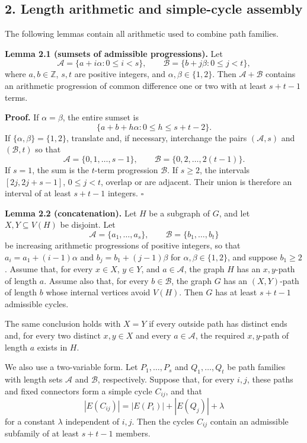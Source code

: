 \documentclass[
  11pt]{article}
\let\papersection\subsection
\renewcommand{\subsection}{\Needspace{10\baselineskip}\papersection}
\begin{document}
\subsection{2. Length arithmetic and simple-cycle
assembly}\label{length-arithmetic-and-simple-cycle-assembly}

The following lemmas contain all arithmetic used to combine path
families.

\textbf{Lemma 2.1 (sumsets of admissible progressions).} Let \[
 \mathcal A=\{a+i\alpha:0\le i<s\},\qquad
 \mathcal B=\{b+j\beta:0\le j<t\},
\] where \(a,b\in\mathbb Z\), \(s,t\) are positive integers, and
\(\alpha,\beta\in\{1,2\}\). Then \(\mathcal A+\mathcal B\) contains an
arithmetic progression of common difference one or two with at least
\(s+t-1\) terms.

\textbf{Proof.} If \(\alpha=\beta\), the entire sumset is \[
 \{a+b+h\alpha:0\le h\le s+t-2\}.
\] If \(\{\alpha,\beta\}=\{1,2\}\), translate and, if necessary,
interchange the pairs \((\mathcal A,s)\) and \((\mathcal B,t)\) so that
\[
 \mathcal A=\{0,1,\ldots,s-1\},\qquad
 \mathcal B=\{0,2,\ldots,2(t-1)\}.
\] If \(s=1\), the sum is the \(t\)-term progression \(\mathcal B\). If
\(s\ge2\), the intervals \([2j,2j+s-1]\), \(0\le j<t\), overlap or are
adjacent. Their union is therefore an interval of at least \(s+t-1\)
integers. \(\square\)

\textbf{Lemma 2.2 (concatenation).} Let \(H\) be a subgraph of \(G\),
and let \(X,Y\subseteq V(H)\) be disjoint. Let \[
 \mathcal A=\{a_1,\ldots,a_s\},\qquad
 \mathcal B=\{b_1,\ldots,b_t\}
\] be increasing arithmetic progressions of positive integers, so that
\(a_i=a_1+(i-1)\alpha\) and \(b_j=b_1+(j-1)\beta\) for
\(\alpha,\beta\in\{1,2\}\), and suppose \(b_1\ge2\). Assume that, for
every \(x\in X\), \(y\in Y\), and \(a\in\mathcal A\), the graph \(H\)
has an \(x,y\)-path of length \(a\). Assume also that, for every
\(b\in\mathcal B\), the graph \(G\) has an \((X,Y)\)-path of length
\(b\) whose internal vertices avoid \(V(H)\). Then \(G\) has at least
\(s+t-1\) admissible cycles.

The same conclusion holds with \(X=Y\) if every outside path has
distinct ends and, for every two distinct \(x,y\in X\) and every
\(a\in\mathcal A\), the required \(x,y\)-path of length \(a\) exists in
\(H\).

We also use a two-variable form. Let \(P_1,\ldots,P_s\) and
\(Q_1,\ldots,Q_t\) be path families with length sets \(\mathcal A\) and
\(\mathcal B\), respectively. Suppose that, for every \(i,j\), these
paths and fixed connectors form a simple cycle \(C_{ij}\), and that \[
 |E(C_{ij})|=|E(P_i)|+|E(Q_j)|+\lambda
\] for a constant \(\lambda\) independent of \(i,j\). Then the cycles
\(C_{ij}\) contain an admissible subfamily of at least \(s+t-1\)
members.
\end{document}
